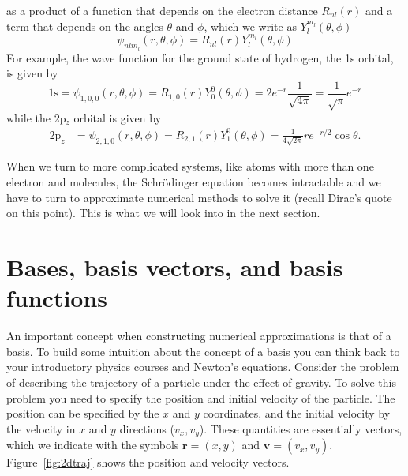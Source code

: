 \documentclass[../Main/notes.tex]{subfiles}
\begin{document}
 as a product of a function that depends on the electron distance $R_{nl}(r)$ and a term that depends on the angles $\theta$ and $\phi$, which we write as $Y_l^{m_l}(\theta,\phi)$
\begin{equation}
\psi_{nlm_l}(r,\theta,\phi) = R_{nl}(r) Y_l^{m_l}(\theta,\phi)
\end{equation}
For example, the wave function for the  ground state of hydrogen, the 1s orbital, is given by
\begin{equation}
\mathrm{1s} = \psi_{1,0,0}(r,\theta,\phi) = R_{1,0}(r) Y_0^0(\theta,\phi) = 2 e^{-r} \frac{1}{\sqrt{4\pi}} = \frac{1}{\sqrt{\pi}} e^{-r}
\end{equation}
while the 2p$_{z}$ orbital is given by
\begin{align}
\mathrm{2p}_{z} &= \psi_{2,1,0}(r,\theta,\phi) = R_{2,1}(r) Y_1^{0}(\theta,\phi) =
\frac{1}{4\sqrt{2 \pi}}   r e^{-r/2} \cos \theta.
\end{align}

When we turn to more complicated systems, like atoms with more than one electron and molecules, the Schr\"{o}dinger equation becomes intractable and we have to turn to approximate numerical methods to solve it (recall Dirac's quote on this point).
This is what we will look into in the next section.

\section{Bases, basis vectors, and basis functions}


An important concept when constructing numerical approximations is that of a basis.
To build some intuition about the concept of a basis you can think back to your introductory physics courses and Newton's equations.
Consider the problem of describing the trajectory of a particle under the effect of gravity.
To solve this problem you need to specify the position and initial velocity of the particle.
The position can be specified by the $x$ and $y$ coordinates, and the initial velocity by the velocity in $x$ and $y$ directions ($v_x, v_y$).
These quantities are essentially vectors, which we indicate with the symbols $\mathbf{r} = (x,y)$ and $\mathbf{v} = (v_x,v_y)$.
Figure~\ref{fig:2dtraj} shows the position and velocity vectors.
\end{document}
